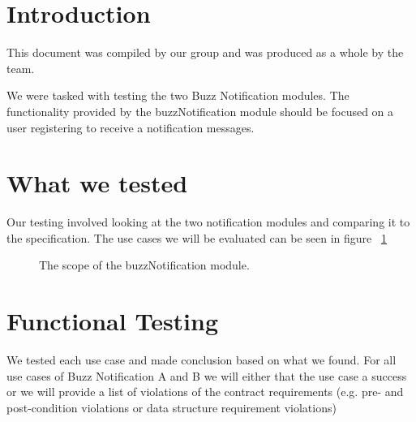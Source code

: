 \documentclass[a4paper,12pt,titlepage]{article}
\begin{document}



\newpage
\tableofcontents
\newpage
\section{Introduction}

This document was compiled by our group and was produced as a whole by the team. \bigskip

We were tasked with testing the two Buzz Notification modules. The functionality provided by the buzzNotification module should be focused on a user registering to receive a notification messages.


\section{What we tested}
Our testing involved looking at the two notification modules and comparing it to the specification. The use cases we will be evaluated can be seen in figure ~\ref{fig:scope}
\begin{figure}[H]
	\centering
	\caption{The scope of the buzzNotification module.}
	\label{fig:scope}
\end{figure}
\newpage

\section{Functional Testing}
We tested each use case and made conclusion based on what we found. For all use cases of Buzz Notification A and B we will either that the use case a success or we will provide a list of violations of the contract requirements (e.g. pre- and post-condition violations or data structure requirement violations)
\end{document}
